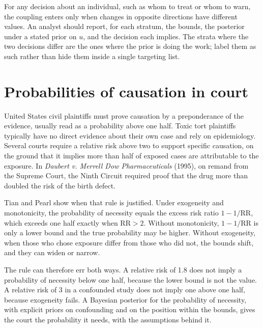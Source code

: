 For any decision about an individual, such as whom to treat or whom to warn, the coupling enters only when changes in opposite directions have different values. An analyst should report, for each stratum, the bounds, the posterior under a stated prior on $u$, and the decision each implies. The strata where the two decisions differ are the ones where the prior is doing the work; label them as such rather than hide them inside a single targeting list.

\section{Probabilities of causation in court}\label{sec:court}

United States civil plaintiffs must prove causation by a preponderance of the evidence, usually read as a probability above one half. Toxic tort plaintiffs typically have no direct evidence about their own case and rely on epidemiology. Several courts require a relative risk above two to support specific causation, on the ground that it implies more than half of exposed cases are attributable to the exposure. In \emph{Daubert v. Merrell Dow Pharmaceuticals} (1995), on remand from the Supreme Court, the Ninth Circuit required proof that the drug more than doubled the risk of the birth defect.

Tian and Pearl show when that rule is justified. Under exogeneity and monotonicity, the probability of necessity equals the excess risk ratio $1 - 1/\mathrm{RR}$, which exceeds one half exactly when $\mathrm{RR} > 2$. Without monotonicity, $1 - 1/\mathrm{RR}$ is only a lower bound and the true probability may be higher. Without exogeneity, when those who chose exposure differ from those who did not, the bounds shift, and they can widen or narrow.

The rule can therefore err both ways. A relative risk of 1.8 does not imply a probability of necessity below one half, because the lower bound is not the value. A relative risk of 3 in a confounded study does not imply one above one half, because exogeneity fails. A Bayesian posterior for the probability of necessity, with explicit priors on confounding and on the position within the bounds, gives the court the probability it needs, with the assumptions behind it.

